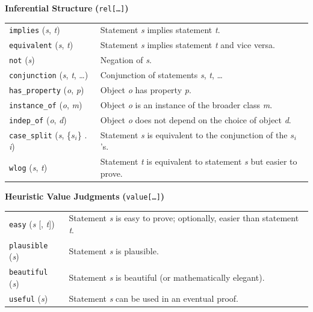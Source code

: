\documentclass[smallextended,oneside]{svjour3}       %
\begin{document}
\begin{table}[ht]
\begin{mdframed}
{\centering
\textbf{Inferential Structure}  \textbf{(}\texttt{rel[\ldots]}\textbf{)}

\par}

\smallskip

\noindent
\begin{tabular}{@{\hspace{-.25ex}}p{}p{}}
\texttt{implies} (\emph{s}, \emph{t}) & Statement \emph{s} implies statement \emph{t}.\\
\texttt{equivalent} (\emph{s}, \emph{t}) & Statement \emph{s} implies statement \emph{t} and vice versa.\\
\texttt{not} (\emph{s}) & Negation of \emph{s}.\\
\texttt{conjunction} (\emph{s}, \emph{t}, \ldots) & Conjunction of statements \emph{s}, \emph{t}, \ldots \\
\texttt{has\_property} (\emph{o}, \emph{p}) & Object \emph{o} has property \emph{p}.\\
\texttt{instance\_of} (\emph{o}, \emph{m}) & Object \emph{o} is an instance of the broader class \emph{m}.\\
\texttt{indep\_of} (\emph{o}, \emph{d}) & Object \emph{o} does not depend on the choice of object \emph{d}.\\
\texttt{case\_split} (\emph{s}, \{$s_i$\} . \emph{i}) & Statement \emph{s} is equivalent to the conjunction of the $s_i$'s.\\
\texttt{wlog} (\emph{s}, \emph{t}) & Statement \emph{t} is equivalent to statement \emph{s} but easier to prove.\\
\end{tabular}

\medskip

{\centering
\textbf{Heuristic Value Judgments} \textbf{(}\texttt{value[\ldots]}\textbf{)}

\par}

\smallskip

\noindent
\begin{tabular}{@{\hspace{-.25ex}}p{}p{}}
\texttt{easy} (\emph{s} [, \emph{t}]) & Statement \emph{s} is easy to prove; optionally, easier than statement \emph{t}.\\
\texttt{plausible} (\emph{s}) & Statement \emph{s} is plausible.\\
\texttt{beautiful} (\emph{s}) & Statement \emph{s} is beautiful (or mathematically elegant).\\
\texttt{useful} (\emph{s}) & Statement \emph{s} can be used in an eventual proof.\\
\end{tabular}


\end{mdframed}
\end{table}
\end{document}

